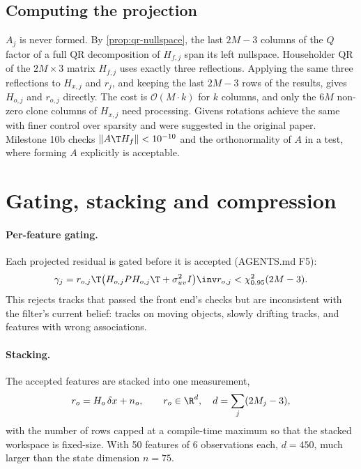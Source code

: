 \subsection{Computing the projection}

$A_j$ is never formed. By \cref{prop:qr-nullspace}, the last $2M - 3$ columns of the $Q$ factor of a full QR decomposition of $H_{f,j}$
span its left nullspace. Householder QR of the $2M\times3$ matrix $H_{f,j}$ uses exactly three reflections. Applying the same three
reflections to $H_{x,j}$ and $r_j$, and keeping the last $2M - 3$ rows of the results, gives $H_{o,j}$ and $r_{o,j}$ directly. The cost is
$\mathcal{O}(M\cdot k)$ for $k$ columns, and only the $6M$ non-zero clone columns of $H_{x,j}$ need processing. Givens rotations achieve the
same with finer control over sparsity and were suggested in the original paper. Milestone 10b checks
$\|A\T H_f\| < 10^{-10}$ and the orthonormality of $A$ in a test, where forming $A$ explicitly is acceptable.

\section{Gating, stacking and compression}

\paragraph{Per-feature gating.} Each projected residual is gated before it is accepted (AGENTS.md F5):
\begin{equation}
  \gamma_j = r_{o,j}\T\big(H_{o,j}PH_{o,j}\T + \sigma_{uv}^2I\big)\inv r_{o,j} < \chi^2_{0.95}(2M - 3).
\end{equation}
This rejects tracks that passed the front end's checks but are inconsistent with the filter's current belief: tracks on moving
objects, slowly drifting tracks, and features with wrong associations.

\paragraph{Stacking.} The accepted features are stacked into one measurement,
\begin{equation}
  r_o = H_o\,\delta x + n_o, \qquad r_o \in \R^d,\quad d = \sum_j (2M_j - 3),
\end{equation}
with the number of rows capped at a compile-time maximum so that the stacked workspace is fixed-size. With 50 features of 6
observations each, $d = 450$, much larger than the state dimension $n = 75$.

